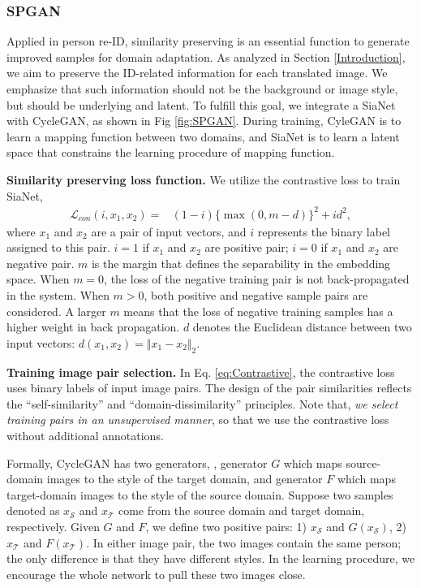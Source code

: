 \documentclass[10pt,twocolumn,letterpaper]{article}
\begin{document}
\subsubsection{SPGAN}
Applied in person re-ID, similarity preserving is an essential function to generate improved samples for domain adaptation. As analyzed in Section \ref{Introduction}, we aim to preserve the ID-related information for each translated image. We emphasize that such information should not be the background or image style, but should be underlying and latent. 
To fulfill this goal, we integrate a SiaNet with CycleGAN, as shown in Fig \ref{fig:SPGAN}. During training, CyleGAN is to learn a mapping function between two domains, and SiaNet is to learn a latent space that constrains the learning procedure of mapping function. 

\textbf{Similarity preserving loss function.}
We utilize the contrastive loss \cite{DBLP:conf/cvpr/HadsellCL06} to train SiaNet,
\begin{equation}
\begin{split}
\mathcal{L}_{con}(i, x_{1}, x_{2}) = &(1-i)\{\max(0, m - d)\}^2 + id^2,
\end{split}
\label{eq:Contrastive}
\end{equation}
{where $x_{1}$ and $x_{2}$ are a pair of input vectors, and $i$  represents the binary label assigned to this pair. $i= 1$ if $x_{1}$ and $x_{2}$ are positive pair; $i= 0$ if $x_{1}$ and $x_{2}$ are negative pair. $m$ is the margin that defines the separability in the embedding space.
When $m=0$, the {loss of the negative training pair is not back-propagated in the system. When $m > 0$, both positive and negative sample pairs are considered.} A larger $m$ means that the loss of negative training samples has a higher weight in back propagation. $d$ denotes the Euclidean distance between two input vectors: $d(x_1, x_2) = \Vert{x_{1}- x_{2}\Vert}_{2}$.}

\textbf{Training image pair selection.} In Eq. \ref{eq:Contrastive}, the contrastive loss uses binary labels of input image pairs. The design of the pair similarities reflects the ``self-similarity'' and ``domain-dissimilarity'' principles. Note that, \emph{we select training pairs in an unsupervised manner}, so that we use the contrastive loss without additional annotations.

Formally, CycleGAN has two generators, \ie, generator $G$ which maps source-domain images to the style of the target domain, and generator $F$ which maps target-domain images to the style of the source domain. Suppose two samples denoted as $x_\mathcal{S}$ and $x_\mathcal{T}$ come from the source domain and target domain, respectively. Given $G$ and $F$, we define two positive pairs: 1) $x_{\mathcal{S}}$ and $G(x_\mathcal{S})$, 2) $x_\mathcal{T}$ and $F(x_\mathcal{T})$. In either image pair, the two images contain the same person; the only difference is that they have different styles. In the learning procedure, we encourage the whole network to pull these two images close. 
\end{document}
